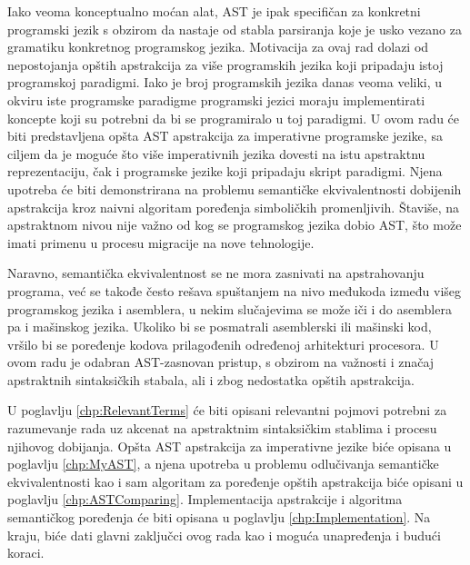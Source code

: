 Iako veoma konceptualno moćan alat, AST je ipak specifičan za konkretni programski jezik s obzirom da nastaje od stabla parsiranja koje je usko vezano za gramatiku konkretnog programskog jezika. Motivacija za ovaj rad dolazi od nepostojanja opštih apstrakcija za više programskih jezika koji pripadaju istoj programskoj paradigmi. Iako je broj programskih jezika danas veoma veliki, u okviru iste programske paradigme programski jezici moraju implementirati koncepte koji su potrebni da bi se programiralo u toj paradigmi. U ovom radu će biti predstavljena opšta AST apstrakcija za imperativne programske jezike, sa ciljem da je moguće što više imperativnih jezika dovesti na istu apstraktnu reprezentaciju, čak i programske jezike koji pripadaju skript paradigmi. Njena upotreba će biti demonstrirana na problemu semantičke ekvivalentnosti dobijenih apstrakcija kroz naivni algoritam poređenja simboličkih promenljivih. Štaviše, na apstraktnom nivou nije važno od kog se programskog jezika dobio AST, što može imati primenu u procesu migracije na nove tehnologije.

Naravno, semantička ekvivalentnost se ne mora zasnivati na apstrahovanju programa, već se takođe često rešava spuštanjem na nivo međukoda između višeg programskog jezika i asemblera, u nekim slučajevima se može iči i do asemblera pa i mašinskog jezika. Ukoliko bi se posmatrali asemblerski ili mašinski kod, vršilo bi se poređenje kodova prilagođenih određenoj arhitekturi procesora. U ovom radu je odabran AST-zasnovan pristup, s obzirom na važnosti i značaj apstraktnih sintaksičkih stabala, ali i zbog nedostatka opštih apstrakcija.

U poglavlju \ref{chp:RelevantTerms} će biti opisani relevantni pojmovi potrebni za razumevanje rada uz akcenat na apstraktnim sintaksičkim stablima i procesu njihovog dobijanja. Opšta AST apstrakcija za imperativne jezike biće opisana u poglavlju \ref{chp:MyAST}, a njena upotreba u problemu odlučivanja semantičke ekvivalentnosti kao i sam algoritam za poređenje opštih apstrakcija biće opisani u poglavlju \ref{chp:ASTComparing}. Implementacija apstrakcije i algoritma semantičkog poređenja će biti opisana u poglavlju \ref{chp:Implementation}. Na kraju, biće dati glavni zaključci ovog rada kao i moguća unapređenja i budući koraci. 

